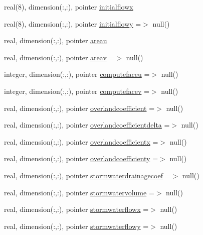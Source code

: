 \begin{DoxyCompactItemize}
\item 
real(8), dimension(\+:,\+:), pointer \mbox{\hyperlink{structmodulerunoff_1_1t__runoff_adbc47c3167438fd253d94005d820e44d}{initialflowx}}
\item 
real(8), dimension(\+:,\+:), pointer \mbox{\hyperlink{structmodulerunoff_1_1t__runoff_a6f027ecd1ea16b9033957b68f722f151}{initialflowy}} =$>$ null()
\item 
real, dimension(\+:,\+:), pointer \mbox{\hyperlink{structmodulerunoff_1_1t__runoff_adec7412072ccac4ec16cc8f3357039f4}{areau}}
\item 
real, dimension(\+:,\+:), pointer \mbox{\hyperlink{structmodulerunoff_1_1t__runoff_a621b50f5e67c766b9fceb49943b5402e}{areav}} =$>$ null()
\item 
integer, dimension(\+:,\+:), pointer \mbox{\hyperlink{structmodulerunoff_1_1t__runoff_a6a6a6f787be75c03f3e638b8bc5120aa}{computefaceu}} =$>$ null()
\item 
integer, dimension(\+:,\+:), pointer \mbox{\hyperlink{structmodulerunoff_1_1t__runoff_aa40fc413a26a34eb08393aa6b9261f07}{computefacev}} =$>$ null()
\item 
real, dimension(\+:,\+:), pointer \mbox{\hyperlink{structmodulerunoff_1_1t__runoff_a9044513e5e3e2eea3a5af82a1926cd44}{overlandcoefficient}} =$>$ null()
\item 
real, dimension(\+:,\+:), pointer \mbox{\hyperlink{structmodulerunoff_1_1t__runoff_a9ce937567a07724f384ce17c436b47a6}{overlandcoefficientdelta}} =$>$ null()
\item 
real, dimension(\+:,\+:), pointer \mbox{\hyperlink{structmodulerunoff_1_1t__runoff_a1c3eea12412cad66b6baf593ecebca07}{overlandcoefficientx}} =$>$ null()
\item 
real, dimension(\+:,\+:), pointer \mbox{\hyperlink{structmodulerunoff_1_1t__runoff_a7d0c9b0139ddd56478c13af30b7ea94a}{overlandcoefficienty}} =$>$ null()
\item 
real, dimension(\+:,\+:), pointer \mbox{\hyperlink{structmodulerunoff_1_1t__runoff_ad87256a39288de0a329dbac105fe2452}{stormwaterdrainagecoef}} =$>$ null()
\item 
real, dimension(\+:,\+:), pointer \mbox{\hyperlink{structmodulerunoff_1_1t__runoff_a28c8d7f1bd22c260dc20f0ceef917565}{stormwatervolume}} =$>$ null()
\item 
real, dimension(\+:,\+:), pointer \mbox{\hyperlink{structmodulerunoff_1_1t__runoff_ab734ad1472f230f91bc791ba21649dfb}{stormwaterflowx}} =$>$ null()
\item 
real, dimension(\+:,\+:), pointer \mbox{\hyperlink{structmodulerunoff_1_1t__runoff_a1c44db641407f2d53ebb8939f6c81435}{stormwaterflowy}} =$>$ null()

\end{DoxyCompactItemize}

